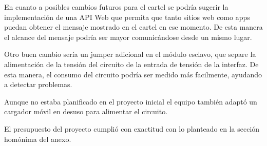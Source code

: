 En cuanto a posibles cambios futuros para el cartel se podría sugerir la implementación de una API Web que permita que tanto sitios web como apps puedan obtener el mensaje mostrado en el cartel en ese momento. De esta manera el alcance del mensaje podría ser mayor comunicándose desde un mismo lugar.

Otro buen cambio sería un jumper adicional en el módulo esclavo, que separe la alimentación de la tensión del circuito de la entrada de tensión de la interfaz. De esta manera, el consumo del circuito podría ser medido más facilmente, ayudando a detectar problemas.

Aunque no estaba planificado en el proyecto inicial el equipo también adaptó un cargador móvil en desuso para alimentar el circuito.

El presupuesto del proyecto cumplió con exactitud con lo planteado en la sección homónima del anexo.
